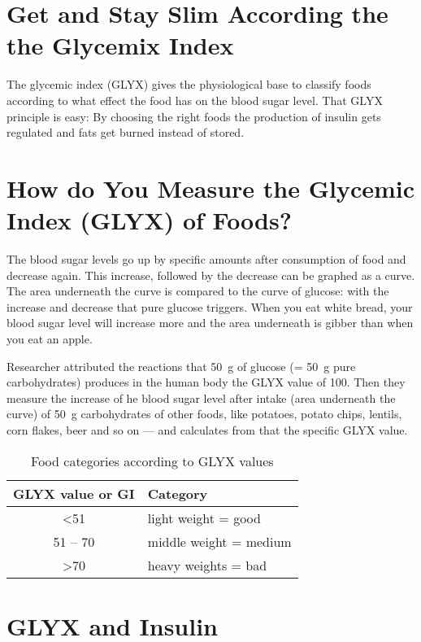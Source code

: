 \documentclass[../main.tex]{subfiles}
\begin{document}
\label{glycemic}

\section{Get and Stay Slim According the the Gly\-ce\-mix Index}

The glycemic index (GLYX) gives the physiological base to classify foods according to
what effect the food has on the blood sugar level.
That GLYX principle is easy: By choosing the right foods the production of insulin gets regulated and fats get burned instead of stored.

\section{How do You Measure the Glycemic Index (GLYX) of Foods?}

The blood sugar levels go up by specific amounts after consumption of food and decrease again.
This increase, followed by the decrease can be graphed as a curve.
The area underneath the curve is compared to the curve of glucose: with the increase and decrease that pure glucose triggers.
When you eat white bread, your blood sugar level will increase more and the area underneath is gibber than when you eat an apple.

Researcher attributed the reactions that \SI{50}{\gram} of glucose (= \SI{50}{\gram} pure carbohydrates) produces in the human body the GLYX value of 100.
Then they measure the increase of he blood sugar level after intake (area underneath the curve)
of \SI{50}{\gram} carbohydrates of other foods, like potatoes, potato chips, lentils, corn flakes, beer and so on --- and calculates from that the specific GLYX value.

\begin{table}[htb!]
  \centering
  \begin{tabular}{cl}
    \textbf{GLYX value or GI} & \textbf{Category} \\
    \hline
    \textless 51 & light weight = good \\
    51 -- 70 & middle weight = medium \\
    \textgreater 70 & heavy weights = bad \\
  \end{tabular}
  \caption{Food categories according to GLYX values}
\end{table}

\section{GLYX and Insulin}
\end{document}
